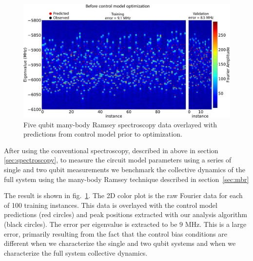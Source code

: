 \begin{figure}[h]
    \begin{center}
        \includegraphics[width=150 mm]{./PDF/fourier_amp_2d_tv_pre_v2.pdf}
    \end{center}
        \caption{
        Five qubit many-body Ramsey spectroscopy data overlayed with predictions from control model prior to optimization.
        }
    \label{mbr_benchmark_pre_optimization}
\end{figure}
After using the conventional spectroscopy, described in above in section \ref{sec:spectroscopy}, to measure the circuit model parameters
using a series of single and two qubit measurements we benchmark the collective dynamics of the full system using the many-body Ramsey technique
described in section~\ref{sec:mbr}

The result is shown in fig.~\ref{mbr_benchmark_pre_optimization}.
The 2D color plot is the raw Fourier data for each of 100 training instances.
This data is overlayed with the control model predictions (red circles) and peak positions extracted with our analysis algorithm (black circles).
The error per eigenvalue is extracted to be $9$ MHz.
This is a large error, primarily resulting from the fact that the control bias conditions are different when we characterize
the single and two qubit systems and when we characterize the full system collective dynamics.

